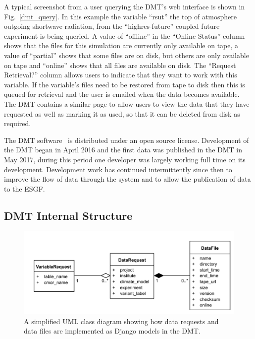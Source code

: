 \documentclass[gmd, manuscript]{copernicus}
\begin{document}
A typical screenshot from a user querying the DMT's web interface is shown in Fig.~\ref{dmt_query}. In this example the variable ``rsut'' the top of atmosphere outgoing shortwave radiation, from the ``highres-future'' coupled future experiment is being queried. A value of ``offline'' in the ``Online Status'' column shows that the files for this simulation are currently only available on tape, a value of ``partial'' shows that some files are on disk, but others are only available on tape and ``online'' shows that all files are available on disk. The ``Request Retrieval?'' column allows users to indicate that they want to work with this variable. If the variable's files need to be restored from tape to disk then this is queued for retrieval and the user is emailed when the data becomes available. The DMT contains a similar page to allow users to view the data that they have requested as well as marking it as used, so that it can be deleted from disk as required.

The DMT software~\citep{Seddon2019} is distributed under an open source license. Development of the DMT began in April 2016 and the first data was published in the DMT in May 2017, during this period one developer was largely working full time on its development. Development work has continued intermittently since then to improve the flow of data through the system and to allow the publication of data to the ESGF. 

\subsection{DMT Internal Structure}

\begin{figure}[t]
	\includegraphics[width=12cm]{fig04.pdf}
	\caption{A simplified UML class diagram showing how data requests and data files are implemented as Django models in the DMT.}
	\label{dmt_struture}
\end{figure}
\end{document}
